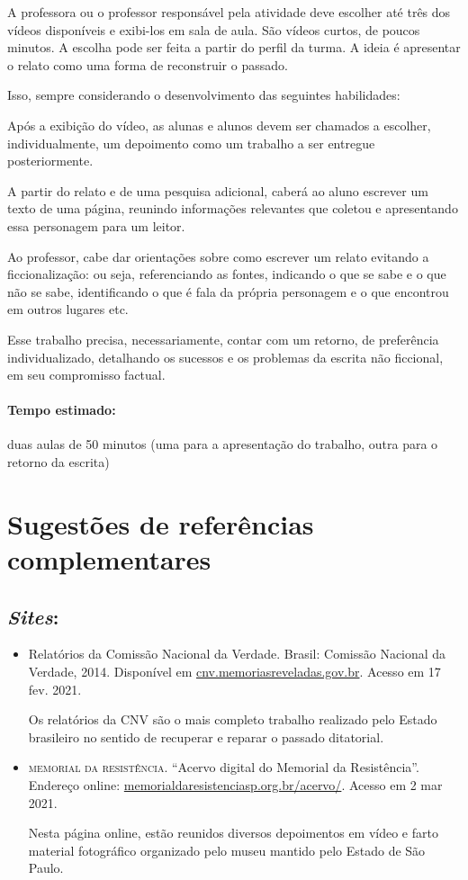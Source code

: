 \documentclass[12pt]{extarticle}
\begin{document}
A professora ou o professor responsável pela atividade deve escolher até
três dos vídeos disponíveis e exibi-los em sala de aula. São vídeos
curtos, de poucos minutos. A escolha pode ser feita a partir do perfil
da turma. A ideia é apresentar o relato como uma forma de
reconstruir o passado.

Isso, sempre considerando o desenvolvimento das seguintes habilidades:


Após a exibição do vídeo, as alunas e alunos devem ser chamados a
escolher, individualmente, um depoimento como um trabalho a ser entregue
posteriormente.

A partir do relato e de uma pesquisa adicional, caberá ao aluno escrever
um texto de uma página, reunindo informações relevantes que coletou e
apresentando essa personagem para um leitor.

Ao professor, cabe dar orientações sobre como escrever um relato
evitando a ficcionalização: ou seja, referenciando as fontes, indicando
o que se sabe e o que não se sabe, identificando o que é fala da própria
personagem e o que encontrou em outros lugares etc.

Esse trabalho precisa, necessariamente, contar com um retorno, de
preferência individualizado, detalhando os sucessos e os problemas da
escrita não ficcional, em seu compromisso factual.

\paragraph{Tempo estimado:} duas aulas de 50 minutos (uma para a
apresentação do trabalho, outra para o retorno da escrita)


\section{Sugestões de referências complementares}

\subsection{\emph{Sites}:}

\begin{itemize}
\item Relatórios da Comissão Nacional da Verdade. Brasil: Comissão
Nacional da Verdade, 2014. Disponível em
\href{http://cnv.memoriasreveladas.gov.br/}{{cnv.memoriasreveladas.gov.br}}.
Acesso em 17 fev. 2021.

Os relatórios da CNV são o mais completo trabalho realizado pelo Estado
brasileiro no sentido de recuperar e reparar o passado ditatorial.

\item \textsc{memorial da resistência}. ``Acervo digital do Memorial da Resistência''. Endereço online: \href{http://http://memorialdaresistenciasp.org.br/acervo/}{{memorialdaresistenciasp.org.br/acervo/}}.
Acesso em 2 mar 2021.

Nesta página online, estão reunidos diversos depoimentos em vídeo e farto material fotográfico organizado pelo museu mantido pelo Estado de São Paulo.
\end{itemize}
\end{document}
